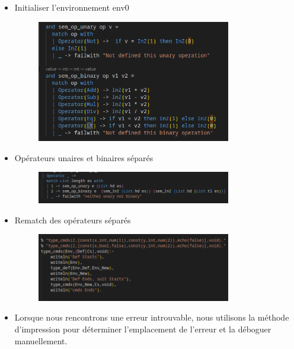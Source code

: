 \documentclass{article}
\begin{document}
\begin{itemize}
		\item Initialiser l'environnement env0
		
		\begin{figure}[H]
			\centering
			\includegraphics[width=0.8\textwidth]{./images/eval2.png}
			\label{fig:exemple1}
		\end{figure}
		
		\item Opérateurs unaires et binaires séparés
		
		\begin{figure}[H]
			\centering
			\includegraphics[width=0.8\textwidth]{./images/eval3.png}
			\label{fig:exemple1}
		\end{figure}
		
		\item Rematch des opérateurs séparés
		
		\begin{figure}[H]
			\centering
			\includegraphics[width=0.8\textwidth]{./images/typage2.png}
			\label{fig:exemple1}
		\end{figure}
		
		\item Lorsque nous rencontrons une erreur introuvable, nous utilisons la méthode d'impression pour déterminer l'emplacement de l'erreur et la déboguer manuellement.
		

\end{itemize}
\end{document}
